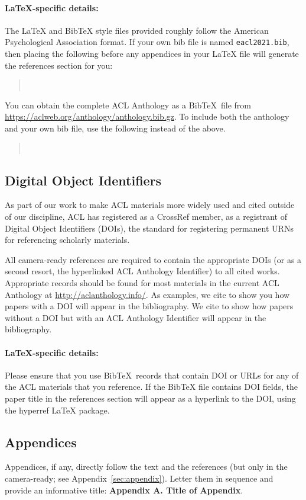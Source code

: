  
 \paragraph{\LaTeX-specific details:}
 The \LaTeX{} and Bib\TeX{} style files provided roughly follow the American Psychological Association format.
 If your own bib file is named \texttt{\small eacl2021.bib}, then placing the following before any appendices in your \LaTeX{}  file will generate the references section for you:
 \begin{quote}\small
 	\verb||\\
 	\verb||
 \end{quote}
 
 You can obtain the complete ACL Anthology as a Bib\TeX\ file from \url{https://aclweb.org/anthology/anthology.bib.gz}.
 To include both the anthology and your own bib file, use the following instead of the above.
 \begin{quote}\small
 	\verb||\\
 	\verb||
 \end{quote}
 
 
 \subsection{Digital Object Identifiers}
 As part of our work to make ACL materials more widely used and cited outside of our discipline, ACL has registered as a CrossRef member, as a registrant of Digital Object Identifiers (DOIs), the standard for registering permanent URNs for referencing scholarly materials.
 
 All camera-ready references are required to contain the appropriate DOIs (or as a second resort, the hyperlinked ACL Anthology Identifier) to all cited works.
 Appropriate records should be found for most materials in the current ACL Anthology at \url{http://aclanthology.info/}.
 As examples, we cite \citep{goodman-etal-2016-noise} to show you how papers with a DOI will appear in the bibliography.
 We cite \citep{harper-2014-learning} to show how papers without a DOI but with an ACL Anthology Identifier will appear in the bibliography.
 
 \paragraph{\LaTeX-specific details:}
 Please ensure that you use Bib\TeX\ records that contain DOI or URLs for any of the ACL materials that you reference.
 If the Bib\TeX{} file contains DOI fields, the paper title in the references section will appear as a hyperlink to the DOI, using the hyperref \LaTeX{} package.
 
 
 \subsection{Appendices}
 Appendices, if any, directly follow the text and the
 references (but only in the camera-ready; see Appendix~\ref{sec:appendix}).
 Letter them in sequence and provide an informative title:
 \textbf{Appendix A. Title of Appendix}.
 